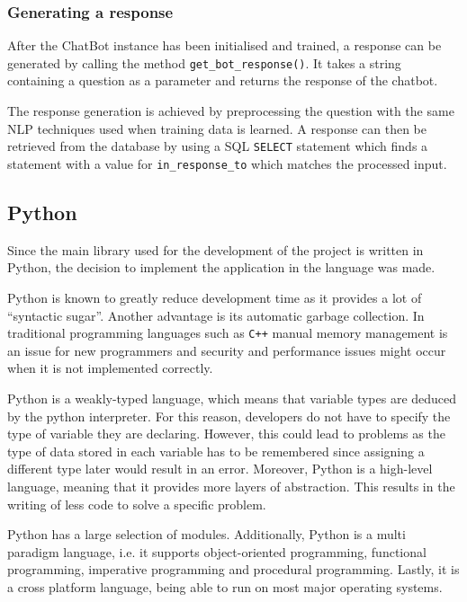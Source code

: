 \documentclass[12pt,a4paper]{article}
\begin{document}

\subsubsection{Generating a response}
After the ChatBot instance has been initialised and trained, a response can be generated by calling the method \texttt{get\_bot\_response()}. It takes a string containing a question as a parameter and returns the response of the chatbot.

The response generation is achieved by preprocessing the question with the same NLP techniques used when training data is learned. A response can then be retrieved from the database by using a SQL \texttt{SELECT} statement which finds a statement with a value for \texttt{in\_response\_to} which matches the processed input.

\subsection{Python}
Since the main library used for the development of the project is written in Python, the decision to implement the application in the language was made. 

Python is known to greatly reduce development time as it provides a lot of \enquote{syntactic sugar}. Another advantage is its automatic garbage collection. In traditional programming languages such as \texttt{C++} manual memory management is an issue for new programmers and security and performance issues might occur when it is not implemented correctly. 

Python is a weakly-typed language, which means that variable types are deduced by the python interpreter. For this reason, developers do not have to specify the type of variable they are declaring. However, this could lead to problems as the type of data stored in each variable has to be remembered since assigning a different type later would result in an error. Moreover, Python is a high-level language, meaning that it provides more layers of abstraction. This results in the writing of less code to solve a specific problem.

Python has a large selection of modules. Additionally, Python is a multi paradigm language, i.e. it supports object-oriented programming, functional programming, imperative programming and procedural programming. Lastly, it is a cross platform language, being able to run on most major operating systems.
\end{document}
